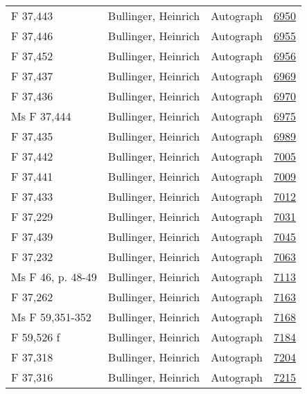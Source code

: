 \documentclass[10pt,a4paper,landscape]{report}
\begin{document}
\begin{longtable}{p{16cm}p{4cm}lr}
F 37,443	&	Bullinger, Heinrich	&	Autograph	&	\href{http://130.60.24.72/assignment/6950}{6950}\\
F 37,446	&	Bullinger, Heinrich	&	Autograph	&	\href{http://130.60.24.72/assignment/6955}{6955}\\
F 37,452	&	Bullinger, Heinrich	&	Autograph	&	\href{http://130.60.24.72/assignment/6956}{6956}\\
F 37,437	&	Bullinger, Heinrich	&	Autograph	&	\href{http://130.60.24.72/assignment/6969}{6969}\\
F 37,436	&	Bullinger, Heinrich	&	Autograph	&	\href{http://130.60.24.72/assignment/6970}{6970}\\
Ms F 37,444	&	Bullinger, Heinrich	&	Autograph	&	\href{http://130.60.24.72/assignment/6975}{6975}\\
F 37,435	&	Bullinger, Heinrich	&	Autograph	&	\href{http://130.60.24.72/assignment/6989}{6989}\\
F 37,442	&	Bullinger, Heinrich	&	Autograph	&	\href{http://130.60.24.72/assignment/7005}{7005}\\
F 37,441	&	Bullinger, Heinrich	&	Autograph	&	\href{http://130.60.24.72/assignment/7009}{7009}\\
F 37,433	&	Bullinger, Heinrich	&	Autograph	&	\href{http://130.60.24.72/assignment/7012}{7012}\\
F 37,229	&	Bullinger, Heinrich	&	Autograph	&	\href{http://130.60.24.72/assignment/7031}{7031}\\
F 37,439	&	Bullinger, Heinrich	&	Autograph	&	\href{http://130.60.24.72/assignment/7045}{7045}\\
F 37,232	&	Bullinger, Heinrich	&	Autograph	&	\href{http://130.60.24.72/assignment/7063}{7063}\\
Ms F 46, p. 48-49	&	Bullinger, Heinrich	&	Autograph	&	\href{http://130.60.24.72/assignment/7113}{7113}\\
F 37,262	&	Bullinger, Heinrich	&	Autograph	&	\href{http://130.60.24.72/assignment/7163}{7163}\\
Ms F 59,351-352	&	Bullinger, Heinrich	&	Autograph	&	\href{http://130.60.24.72/assignment/7168}{7168}\\
F 59,526 f	&	Bullinger, Heinrich	&	Autograph	&	\href{http://130.60.24.72/assignment/7184}{7184}\\
F 37,318	&	Bullinger, Heinrich	&	Autograph	&	\href{http://130.60.24.72/assignment/7204}{7204}\\
F 37,316	&	Bullinger, Heinrich	&	Autograph	&	\href{http://130.60.24.72/assignment/7215}{7215}\\

\end{longtable}
\end{document}
